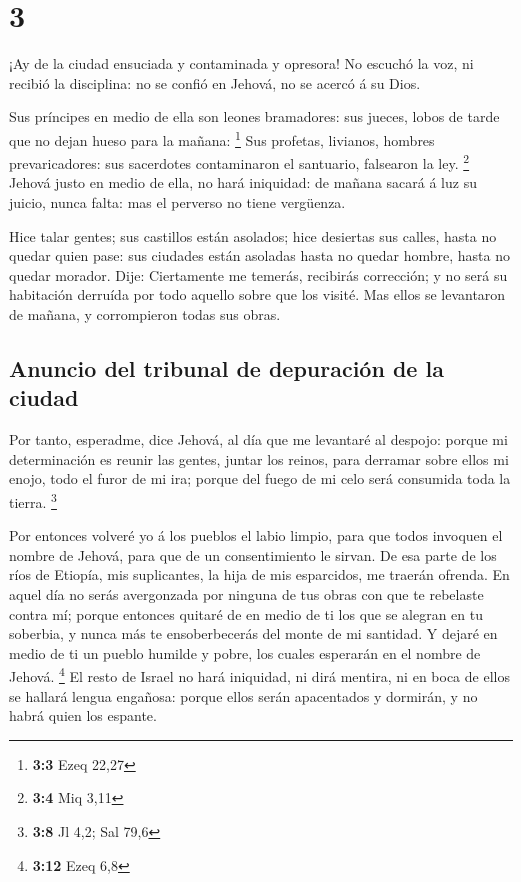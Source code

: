\hypertarget{section-2}{%
\section{3}\label{section-2}}

 ¡Ay de la ciudad ensuciada y contaminada y opresora!
 No escuchó la voz, ni recibió la disciplina: no se confió
en Jehová, no se acercó á su Dios.

 Sus príncipes en medio de ella son leones bramadores: sus
jueces, lobos de tarde que no dejan hueso para la mañana: \footnote{\textbf{3:3}
  Ezeq 22,27}  Sus profetas, livianos, hombres
prevaricadores: sus sacerdotes contaminaron el santuario, falsearon la
ley. \footnote{\textbf{3:4} Miq 3,11}  Jehová justo en
medio de ella, no hará iniquidad: de mañana sacará á luz su juicio,
nunca falta: mas el perverso no tiene vergüenza.

 Hice talar gentes; sus castillos están asolados; hice
desiertas sus calles, hasta no quedar quien pase: sus ciudades están
asoladas hasta no quedar hombre, hasta no quedar morador. 
Dije: Ciertamente me temerás, recibirás corrección; y no será su
habitación derruída por todo aquello sobre que los visité. Mas ellos se
levantaron de mañana, y corrompieron todas sus obras.

\hypertarget{anuncio-del-tribunal-de-depuraciuxf3n-de-la-ciudad}{%
\subsection{Anuncio del tribunal de depuración de la
ciudad}\label{anuncio-del-tribunal-de-depuraciuxf3n-de-la-ciudad}}

 Por tanto, esperadme, dice Jehová, al día que me
levantaré al despojo: porque mi determinación es reunir las gentes,
juntar los reinos, para derramar sobre ellos mi enojo, todo el furor de
mi ira; porque del fuego de mi celo será consumida toda la tierra.
\footnote{\textbf{3:8} Jl 4,2; Sal 79,6}

 Por entonces volveré yo á los pueblos el labio limpio,
para que todos invoquen el nombre de Jehová, para que de un
consentimiento le sirvan.  De esa parte de los ríos de
Etiopía, mis suplicantes, la hija de mis esparcidos, me traerán ofrenda.
 En aquel día no serás avergonzada por ninguna de tus
obras con que te rebelaste contra mí; porque entonces quitaré de en
medio de ti los que se alegran en tu soberbia, y nunca más te
ensoberbecerás del monte de mi santidad.  Y dejaré en
medio de ti un pueblo humilde y pobre, los cuales esperarán en el nombre
de Jehová. \footnote{\textbf{3:12} Ezeq 6,8}  El resto de
Israel no hará iniquidad, ni dirá mentira, ni en boca de ellos se
hallará lengua engañosa: porque ellos serán apacentados y dormirán, y no
habrá quien los espante.

